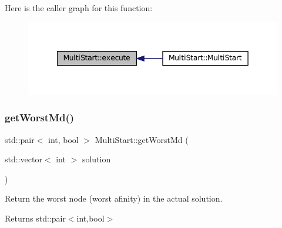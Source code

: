 Here is the caller graph for this function\+:\nopagebreak
\begin{figure}[H]
\begin{center}
\leavevmode
\includegraphics[width=342pt]{classMultiStart_a9d842b1f602c4b8a47bf6d88d483ccae_icgraph}
\end{center}
\end{figure}
\mbox{\label{classMultiStart_a0ad5ed40a5c4ab964cb27f79343eed98}} 
\subsubsection{\texorpdfstring{get\+Worst\+Md()}{getWorstMd()}}
{\footnotesize\ttfamily std\+::pair$<$ int, bool $>$ Multi\+Start\+::get\+Worst\+Md (\begin{DoxyParamCaption}\item[{std\+::vector$<$ int $>$}]{solution }\end{DoxyParamCaption})}



Return the worst node (worst afinity) in the actual solution. 

\begin{DoxyReturn}{Returns}
std\+::pair$<$int,bool$>$ 
\end{DoxyReturn}

